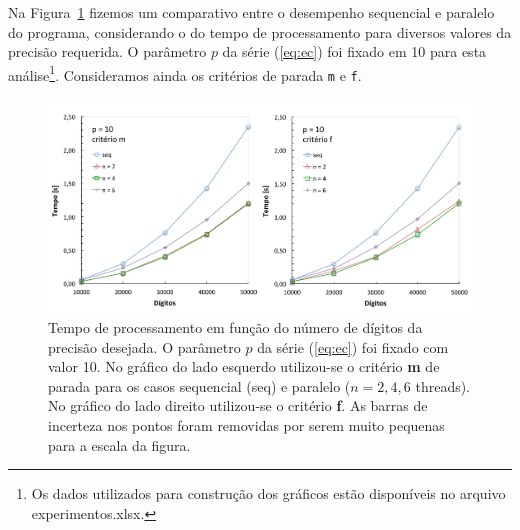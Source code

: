 \documentclass[12pt]{article}
\begin{document}
Na Figura~\ref{fig:digitos} fizemos um comparativo entre o desempenho sequencial e paralelo do 
programa, considerando o do tempo de processamento para diversos valores da precisão requerida. O 
parâmetro $p$ da série (\ref{eq:ec}) foi fixado em 10 para esta análise\footnote{Os dados utilizados 
para construção dos gráficos estão disponíveis no arquivo experimentos.xlsx.}. Consideramos ainda os 
critérios de parada \verb|m| e \verb|f|.
%
\begin{figure}[ht]
	\begin{center}
		\includegraphics[scale=0.5]{digitos.pdf}
		\caption{Tempo de processamento em função do número de dígitos da precisão desejada. O parâmetro 
		$p$ da série (\ref{eq:ec}) foi fixado com valor 10. No gráfico do lado esquerdo utilizou-se o 
		critério {\bf m} de parada para os casos sequencial (seq) e paralelo ($n = 2, 4, 6$ threads). 
		No gráfico do lado direito utilizou-se o critério {\bf f}. As barras de incerteza nos pontos 
		foram removidas por serem muito pequenas para a escala da figura.}
		\label{fig:digitos} 
	\end{center}
\end{figure}
\end{document}
